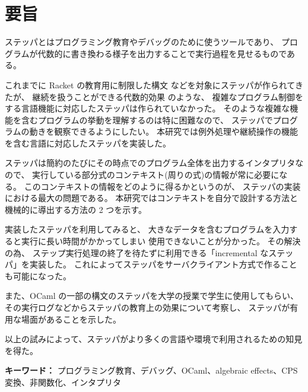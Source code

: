 \chapter*{要旨}

ステッパとはプログラミング教育やデバッグのために使うツールであり、
プログラムが代数的に書き換わる様子を出力することで実行過程を見せるものである。

これまでに Racket \cite{clements01} の教育用に制限した構文
などを対象にステッパが作られてきたが、
継続を扱うことができる代数的効果 \cite{PRETNAR201519} のような、
複雑なプログラム制御をする言語機能に対応したステッパは作られていなかった。
そのような複雑な機能を含むプログラムの挙動を理解するのは特に困難なので、
ステッパでプログラムの動きを観察できるようにしたい。
本研究では例外処理や継続操作の機能を含む言語に対応したステッパを実装した。

ステッパは簡約のたびにその時点でのプログラム全体を出力するインタプリタなので、
実行している部分式のコンテキスト(周りの式)の情報が常に必要になる。
このコンテキストの情報をどのように得るかというのが、
ステッパの実装における最大の問題である。
本研究ではコンテキストを自分で設計する方法と
機械的に導出する方法の 2 つを示す。

実装したステッパを利用してみると、
大きなデータを含むプログラムを入力すると実行に長い時間がかかってしまい
使用できないことが分かった。
その解決の為、
ステップ実行処理の終了を待たずに利用できる「incremental なステッパ」を実装した。
これによってステッパをサーバクライアント方式で作ることも可能になった。

また、OCaml の一部の構文のステッパを大学の授業で学生に使用してもらい、
その実行ログなどからステッパの教育上の効果について考察し、
ステッパが有用な場面があることを示した。

以上の試みによって、ステッパがより多くの言語や環境で利用されるための知見を得た。

\vspace{10mm}

{\bf キーワード：}
プログラミング教育、デバッグ、OCaml、algebraic effects、CPS 変換、非関数化、インタプリタ\ 
